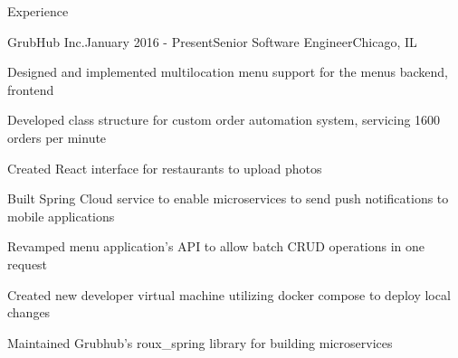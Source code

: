 \documentclass{resume} %
\begin{document}



\begin{rSection}{Experience}


\begin{rSubsection}{GrubHub Inc.}{January 2016 - Present}{Senior Software Engineer}{Chicago, IL}
\item Designed and implemented multilocation menu support for the menus backend, frontend
\item Developed class structure for custom order automation system, servicing 1600 orders per minute
\item Created React interface for restaurants to upload photos
\item Built Spring Cloud service to enable microservices to send push notifications to mobile applications
\item Revamped menu application's API to allow batch CRUD operations in one request
\item Created new developer virtual machine utilizing docker compose to deploy local changes
\item Maintained Grubhub's roux\_spring library for building microservices
\end{rSubsection}



\end{rSection}
\end{document}
